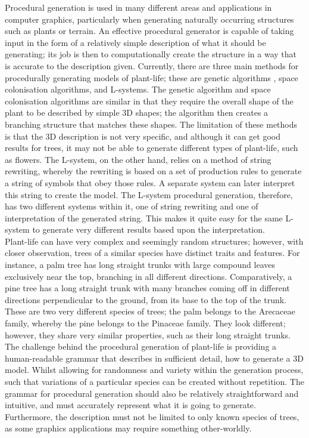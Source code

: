 Procedural generation is used in many different areas and applications in computer graphics, particularly when generating naturally occurring structures such as plants or terrain. An effective procedural generator is capable of taking input in the form of a relatively simple description of what it should be generating; its job is then to computationally create the structure in a way that is accurate to the description given. Currently, there are three main methods for procedurally generating models of plant-life; these are genetic algorithms \cite{haubenwallner2017shapegenetics}, space colonisation algorithms\cite{juuso2017procedural}, and L-systems. The genetic algorithm and space colonisation algorithms are similar in that they require the overall shape of the plant to be described by simple 3D shapes; the algorithm then creates a branching structure that matches these shapes. The limitation of these methods is that the 3D description is not very specific, and although it can get good results for trees, it may not be able to generate different types of plant-life, such as flowers. The L-system, on the other hand, relies on a method of string rewriting, whereby the rewriting is based on a set of production rules to generate a string of symbols that obey those rules. A separate system can later interpret this string to create the model. The L-system procedural generation, therefore, has two different systems within it, one of string rewriting and one of interpretation of the generated string. This makes it quite easy for the same L-system to generate very different results based upon the interpretation.\\

Plant-life can have very complex and seemingly random structures; however, with closer observation, trees of a similar species have distinct traits and features. For instance, a palm tree has long straight trunks with large compound leaves exclusively near the top, branching in all different directions. Comparatively, a pine tree has a long straight trunk with many branches coming off in different directions perpendicular to the ground, from its base to the top of the trunk. These are two very different species of trees; the palm belongs to the Arecaceae family, whereby the pine belongs to the Pinaceae family. They look different; however, they share very similar properties, such as their long straight trunks. The challenge behind the procedural generation of plant-life is providing a human-readable grammar that describes in sufficient detail, how to generate a 3D model. Whilst allowing for randomness and variety within the generation process, such that variations of a particular species can be created without repetition. The grammar for procedural generation should also be relatively straightforward and intuitive, and must accurately represent what it is going to generate. Furthermore, the description must not be limited to only known species of trees, as some graphics applications may require something other-worldly.

